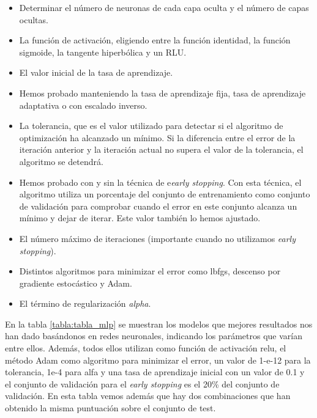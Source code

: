 \documentclass[journal,twoside]{JoPhA}
\begin{document}
\begin{itemize}
	\item Determinar el número de neuronas de cada capa oculta y el número de capas ocultas.  \\
	\item La función de activación, eligiendo entre la función identidad, la función sigmoide, la tangente hiperbólica y un RLU. \\
	\item El valor inicial de la tasa de aprendizaje.  \\
	\item Hemos probado manteniendo la tasa de aprendizaje fija, tasa de aprendizaje adaptativa o con escalado inverso.  \\
	\item La tolerancia, que es el valor utilizado para detectar si el algoritmo de optimización ha alcanzado un mínimo. Si la diferencia entre el error de la iteración anterior y la iteración actual no supera el valor de la tolerancia, el algoritmo se detendrá.  \\
	\item Hemos probado con y sin la técnica de e\textit{early stopping}. Con esta técnica, el algoritmo utiliza un porcentaje del conjunto de entrenamiento como conjunto de validación para comprobar cuando el error en este conjunto alcanza un mínimo y dejar de iterar. Este valor también lo hemos ajustado.   \\
	\item El número máximo de iteraciones (importante cuando no utilizamos \textit{early stopping}).  \\
	\item Distintos algoritmos para minimizar el error como lbfgs, descenso por gradiente estocástico y Adam.  \\
	\item El término de regularización \textit{alpha}.  \\
\end{itemize}

En la tabla \ref{tabla:tabla_mlp} se muestran los modelos que mejores resultados nos han dado basándonos en redes neuronales, indicando los parámetros que varían entre ellos. Además, todos ellos utilizan como función de activación relu, el método Adam como algoritmo para minimizar el error, un valor de 1-e-12 para la tolerancia, 1e-4 para alfa y una tasa de aprendizaje inicial con un valor de 0.1 y el conjunto de validación para el \textit{early stopping} es el 20\% del conjunto de validación. En esta tabla vemos además que hay dos combinaciones que han obtenido la misma puntuación sobre el conjunto de test.
\end{document}
